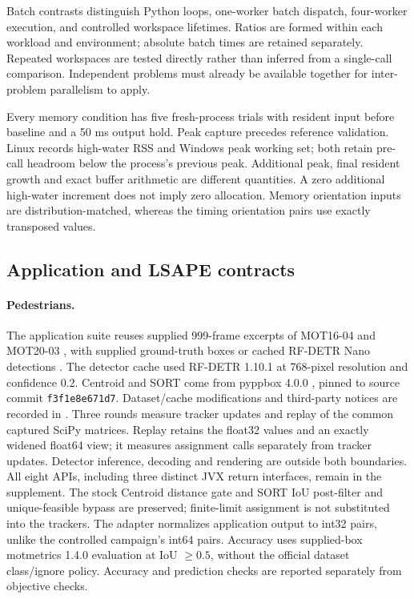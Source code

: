 \documentclass[11pt,a4paper]{article}
\begin{document}
Batch contrasts distinguish Python loops, one-worker batch dispatch, four-worker execution, and controlled workspace lifetimes. Ratios are formed within each workload and environment; absolute batch times are retained separately. Repeated workspaces are tested directly rather than inferred from a single-call comparison. Independent problems must already be available together for inter-problem parallelism to apply.

Every memory condition has five fresh-process trials with resident input before baseline and a 50 ms output hold. Peak capture precedes reference validation. Linux records high-water RSS and Windows peak working set; both retain pre-call headroom below the process's previous peak. Additional peak, final resident growth and exact buffer arithmetic are different quantities. A zero additional high-water increment does not imply zero allocation. Memory orientation inputs are distribution-matched, whereas the timing orientation pairs use exactly transposed values.

\subsection{Application and LSAPE contracts}

\paragraph{Pedestrians.}
The application suite reuses supplied 999-frame excerpts of MOT16-04 and MOT20-03 \cite{milan2016mot16,dendorfer2020mot20}, with supplied ground-truth boxes or cached RF-DETR Nano detections \cite{rfdetr2025software}. The detector cache used RF-DETR 1.10.1 at 768-pixel resolution and confidence 0.2. Centroid and SORT \cite{bewley2016sort} come from pyppbox 4.0.0 \cite{pyppbox2026,siv2022posetreid}, pinned to source commit \texttt{f3f1e8e671d7}. Dataset/cache modifications and third-party notices are recorded in . Three rounds measure tracker updates and replay of the common captured SciPy matrices. Replay retains the float32 values and an exactly widened float64 view; it measures assignment calls separately from tracker updates. Detector inference, decoding and rendering are outside both boundaries. All eight APIs, including three distinct JVX return interfaces, remain in the supplement. The stock Centroid distance gate and SORT IoU post-filter and unique-feasible bypass are preserved; finite-limit assignment is not substituted into the trackers. The adapter normalizes application output to int32 pairs, unlike the controlled campaign's int64 pairs. Accuracy uses supplied-box motmetrics 1.4.0 \cite{motmetrics2026} evaluation at IoU $\geq0.5$, without the official dataset class/ignore policy. Accuracy and prediction checks are reported separately from objective checks.
\end{document}
